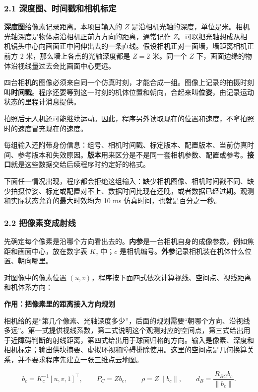 \documentclass[12pt,a4paper]{article}
\numberwithin{equation}{topic}
\begin{document}
\subsubsection*{2.1 深度图、时间戳和相机标定}

\textbf{深度图}给像素记录距离。本项目输入的 \(Z\) 是沿相机光轴的深度，单位是米。相机光轴深度是物体点沿相机正前方方向的距离，通常记作 \(Z\)。可以把光轴想成从相机镜头中心向画面正中间伸出去的一条直线。假设相机正对一面墙，墙距离相机正前方 2 米，那么墙上各点的光轴深度都是 \(Z=2\) 米。同一个 \(Z\) 下，画面边缘的物体沿视线量过去会比画面中心更远。

四台相机的图像必须来自同一个仿真时刻，才能合成一组。图像上记录的拍摄时刻叫\textbf{时间戳}。程序还要等到这一时刻的机体位置和朝向，合起来叫\textbf{位姿}，由记录运动状态的里程计消息提供。

拍照后无人机还可能继续运动。因此，程序另外读取现在的位置和速度，不拿拍照时的速度冒充现在的速度。

每组输入还附带身份信息：组号、相机时间戳、标定版本、配置版本、当前仿真时间、参考版本和失效原因。\textbf{版本}用来区分是不是同一套相机参数、配置或参考。\textbf{接口}就是这些数据交给后续程序时约定好的格式。

下面任一情况出现，程序都会拒绝这组输入：缺少相机图像、相机时间戳不同、缺少拍摄位姿、标定或配置对不上、数据时间比现在还晚，或者数据已经过期。观测和实际状态允许的最大时效均为 10 ms 仿真时间，也就是百分之一秒。

\subsubsection*{2.2 把像素变成射线}

先确定每个像素是沿哪个方向看出去的。\textbf{内参}是一台相机自身的成像参数，例如焦距和画面中心，放在数字表 \(K_c\) 中；\(c\) 是相机编号。\textbf{外参}记录相机装在机体什么位置、朝向哪里。

对图像中的像素位置 \((u,v)\)，程序按下面四式依次计算视线、空间点、视线距离和机体系方向：

\noindent\textbf{作用：把像素里的距离接入方向规划}\par\nobreak
相机给的是“第几个像素、光轴深度多少”，后面的规划需要“朝哪个方向、沿视线多远”。第一式提供视线系数，第二式说明这个观测对应的空间点，第三式给出用于近障碍判断的射线距离，第四式给出用于球面归格的方向。输入是像素、深度和相机标定；输出供块摘要、虚拟环视和障碍排除使用。这里的空间点是几何换算关系，并不要求程序先建立一张三维点云地图。

\begin{equation}
\label{eq:ray}
b_c=K_c^{-1}[u,v,1]^\top,\qquad
P_C=Zb_c,\qquad
\rho=Z\|b_c\|,\qquad
d_B=\frac{R_{BC}b_c}{\|b_c\|}.
\end{equation}
\end{document}
